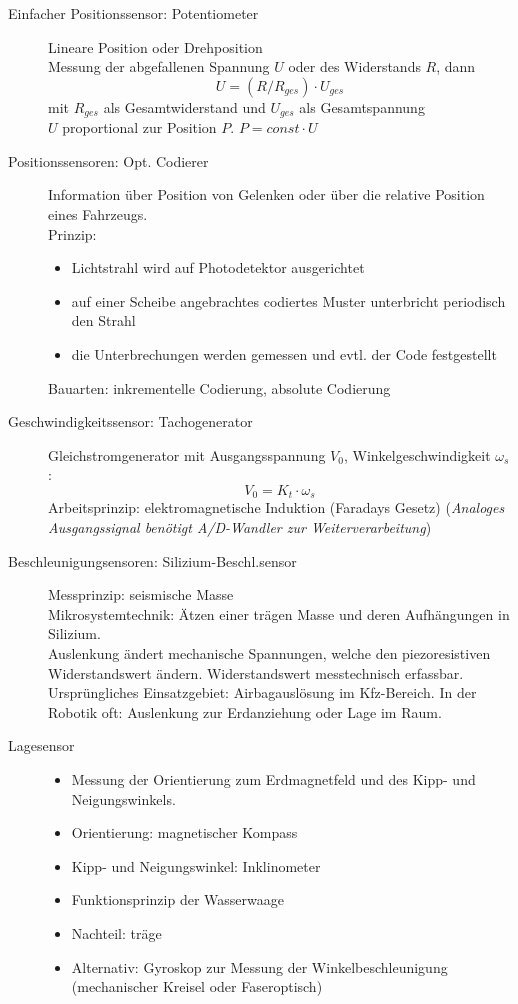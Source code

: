 \begin{description}
\item[Einfacher Positionssensor: Potentiometer] Lineare Position oder Drehposition \\ Messung der abgefallenen Spannung $U$ oder des Widerstands $R$, dann $$U = ( R / R_{ges} ) \cdot U_{ges}$$ mit $R_{ges}$ als Gesamtwiderstand und $U_{ges}$ als Gesamtspannung \\ $U$ proportional zur Position $P$. $P = const \cdot U$
\item[Positionssensoren: Opt. Codierer] Information über Position von Gelenken oder über die relative Position eines Fahrzeugs. \\ Prinzip:
\begin{itemize}
\item Lichtstrahl wird auf Photodetektor ausgerichtet
\item auf einer Scheibe angebrachtes codiertes Muster unterbricht periodisch den Strahl
\item die Unterbrechungen werden gemessen und evtl. der Code festgestellt
\end{itemize}
Bauarten: inkrementelle Codierung, absolute Codierung
\item[Geschwindigkeitssensor: Tachogenerator] Gleichstromgenerator mit Ausgangsspannung $V_0$, Winkelgeschwindigkeit $\omega_s$: $$V_0 = K_t \cdot \omega_s$$
Arbeitsprinzip: elektromagnetische Induktion (Faradays Gesetz) (\textsl{Analoges Ausgangssignal benötigt A/D-Wandler zur Weiterverarbeitung})
\item[Beschleunigungsensoren: Silizium-Beschl.sensor] Messprinzip: seismische Masse \\ Mikrosystemtechnik: Ätzen einer trägen Masse und deren Aufhängungen in Silizium. \\ Auslenkung ändert mechanische Spannungen, welche den piezoresistiven Widerstandswert ändern. Widerstandswert messtechnisch erfassbar. Ursprüngliches Einsatzgebiet: Airbagauslösung im Kfz-Bereich. In der Robotik oft: Auslenkung zur Erdanziehung oder Lage im Raum.
\item[Lagesensor] \quad
\begin{itemize}
\item Messung der Orientierung zum Erdmagnetfeld und des Kipp- und Neigungswinkels.
\item Orientierung: magnetischer Kompass
\item Kipp- und Neigungswinkel: Inklinometer
\item Funktionsprinzip der Wasserwaage
\item Nachteil: träge
\item Alternativ: Gyroskop zur Messung der Winkelbeschleunigung (mechanischer Kreisel oder Faseroptisch)
\end{itemize}
\end{description}

